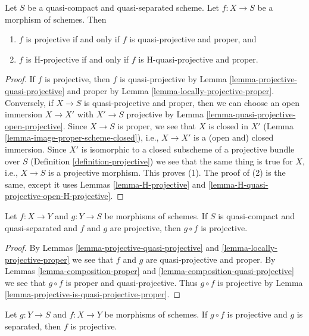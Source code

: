 \begin{lemma}
\label{lemma-projective-is-quasi-projective-proper}
Let $S$ be a quasi-compact and quasi-separated scheme.
Let $f : X \to S$ be a morphism of schemes. Then
\begin{enumerate}
\item $f$ is projective if and only if $f$ is quasi-projective and proper, and
\item $f$ is H-projective if and only if $f$ is H-quasi-projective and proper.
\end{enumerate}
\end{lemma}

\begin{proof}
If $f$ is projective, then $f$ is quasi-projective by
Lemma \ref{lemma-projective-quasi-projective} and proper by
Lemma \ref{lemma-locally-projective-proper}. Conversely, if
$X \to S$ is quasi-projective and proper, then we can choose
an open immersion $X \to X'$ with $X' \to S$ projective by
Lemma \ref{lemma-quasi-projective-open-projective}.
Since $X \to S$ is proper, we see that $X$ is closed in $X'$
(Lemma \ref{lemma-image-proper-scheme-closed}), i.e.,
$X \to X'$ is a (open and) closed immersion.
Since $X'$ is isomorphic to a closed subscheme of a projective
bundle over $S$ (Definition \ref{definition-projective})
we see that the same thing is true for $X$, i.e.,
$X \to S$ is a projective morphism. This proves (1).
The proof of (2) is the same, except it uses
Lemmas \ref{lemma-H-projective} and
\ref{lemma-H-quasi-projective-open-H-projective}.
\end{proof}

\begin{lemma}
\label{lemma-composition-projective}
Let $f : X \to Y$ and $g : Y \to S$ be morphisms of schemes.
If $S$ is quasi-compact and quasi-separated and $f$ and $g$ are projective,
then $g \circ f$ is projective.
\end{lemma}

\begin{proof}
By Lemmas \ref{lemma-projective-quasi-projective} and
\ref{lemma-locally-projective-proper}
we see that $f$ and $g$ are quasi-projective and proper.
By Lemmas \ref{lemma-composition-proper} and
\ref{lemma-composition-quasi-projective}
we see that $g \circ f$ is proper and quasi-projective.
Thus $g \circ f$ is projective by
Lemma \ref{lemma-projective-is-quasi-projective-proper}.
\end{proof}

\begin{lemma}
\label{lemma-projective-permanence}
Let $g : Y \to S$ and $f : X \to Y$ be morphisms of schemes.
If $g \circ f$ is projective and $g$ is separated,
then $f$ is projective.
\end{lemma}

